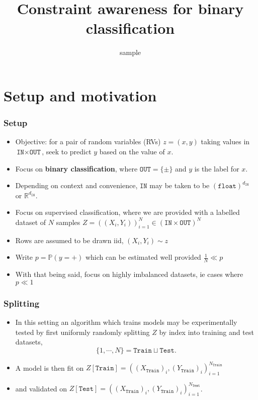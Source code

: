 \documentclass{beamer}
\title{Constraint awareness for binary classification}
\subtitle{sample}
\newcommand{\IN}{{\texttt{IN}}}
\newcommand{\OUT}{{\texttt{OUT}}}
\newcommand{\TWO}{\{\pm\}}
\newcommand{\TRN}{{\texttt{Train}}}
\newcommand{\TST}{{\texttt{Test}}}
\begin{document}
\begin{frame}
\titlepage
\end{frame}

\section{Setup and motivation}
\begin{frame}
\frametitle{Setup}
\begin{itemize}
\item
  Objective: for a pair of random variables (RVs) $z=(x,y)$ taking values in $\IN\times\OUT$, seek to predict $y$ based on the value of $x$.
\item
  Focus on \textbf{binary classification}, where $\OUT=\TWO$ and $y$ is the label for $x$.
\item
  Depending on context and convenience, $\IN$ may be taken to be $\left(\texttt{float}\right)^{d_\IN}$ or $\mathbb R^{d_\IN}$.
\item
Focus on supervised classification, where we are provided with a labelled dataset of $N$ samples $Z=\left((X_i,Y_i)\right)_{i=1}^N\in\left(\IN\times\OUT\right)^N$
\item
Rows are assumed to be drawn iid, $(X_i,Y_i)\sim z$
\item
Write $p=\mathbb P(y=+)$ which can be estimated well provided $\tfrac1N\ll p$
\item
With that being said, focus on highly imbalanced datasets, ie cases where $p\ll1$
\end{itemize}
\end{frame}
\begin{frame}
\frametitle{Splitting}
\begin{itemize}
\item
In this setting an algorithm which trains models may be experimentally tested by first uniformly randomly splitting $Z$ by index into training and test datasets,
$$
\{1,\cdots,N\}=\TRN\sqcup\TST.
$$
\item
A model is then fit on $Z[\TRN]=\left((X_\TRN)_i,(Y_\TRN)_i\right)_{i=1}^{N_\TRN}$
\item
and validated on $Z[\TST]=\left((X_\TRN)_i,(Y_\TRN)_i\right)_{i=1}^{N_\TST}$.
\end{itemize}
\end{frame}
\end{document}
